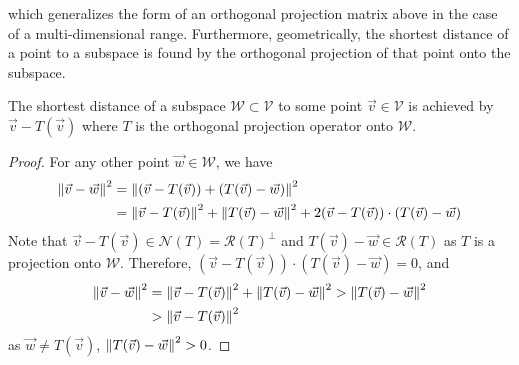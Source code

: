 which generalizes the form of an orthogonal projection matrix above in the case of a multi-dimensional range. Furthermore, geometrically, the shortest distance of a point to a subspace is found by the orthogonal projection of that point onto the subspace.
\begin{proper}
\label{proper:shortestorthoproj}
The shortest distance of a subspace $\mathcal{W} \subset \mathcal{V}$ to some point $\vec{v} \in \mathcal{V}$ is achieved by $\vec{v} - T(\vec{v})$ where $T$ is the orthogonal projection operator onto $\mathcal{W}$.
\end{proper}
\begin{proof}
For any other point $\vec{w} \in \mathcal{W}$, we have
\begin{align*}
\norm{\vec{v} - \vec{w}}^2 &= \norm{(\vec{v} - T(\vec{v})) + (T(\vec{v}) - \vec{w})}^2 \\
&= \norm{\vec{v} - T(\vec{v})}^2 + \norm{T(\vec{v}) - \vec{w}}^2 + 2 (\vec{v} - T(\vec{v})) \cdot (T(\vec{v}) - \vec{w})
\end{align*}
Note that $\vec{v} - T(\vec{v}) \in \mathcal{N}(T) = \mathcal{R}(T)^\perp$ and $T(\vec{v}) - \vec{w} \in \mathcal{R}(T)$ as $T$ is a projection onto $\mathcal{W}$. Therefore, $(\vec{v} - T(\vec{v})) \cdot (T(\vec{v}) - \vec{w}) = 0$, and 
\begin{subequations}
\begin{align}
\norm{\vec{v} - \vec{w}}^2 &= \norm{\vec{v} - T(\vec{v})}^2 + \norm{T(\vec{v}) - \vec{w}}^2 > \norm{T(\vec{v}) - \vec{w}}^2 \label{eqn:shortestsubspacealta} \\
& > \norm{\vec{v} - T(\vec{v})}^2 \label{eqn:shortestsubspacealtb}
\end{align}
\end{subequations}
as $\vec{w} \neq T(\vec{v})$, $\norm{T(\vec{v}) - \vec{w}}^2 > 0$.
\end{proof}
